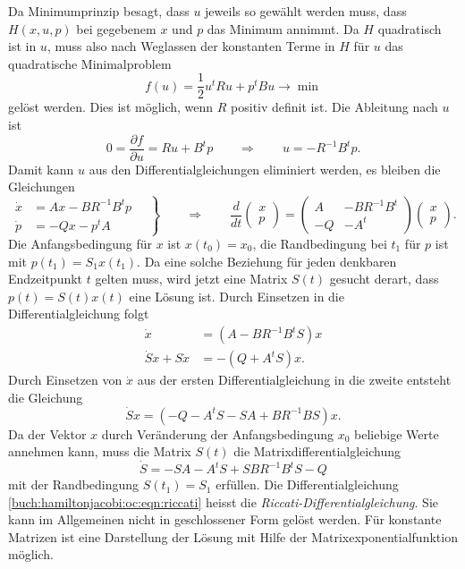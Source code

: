 Da  Minimumprinzip besagt, dass $u$ jeweils so gewählt werden muss,
dass $H(x,u,p)$ bei gegebenem $x$ und $p$ das Minimum annimmt.
Da $H$ quadratisch ist in $u$, muss also nach Weglassen der konstanten
Terme in $H$ für $u$ das quadratische Minimalproblem
\[
f(u)
=
\frac12 u^t R u + p^t Bu
\to
\min
\]
gelöst werden.
Dies ist möglich, wenn $R$ positiv definit ist.
Die Ableitung nach $u$ ist
\[
0
=
\frac{\partial f}{\partial u}
=
Ru + B^tp
\qquad\Rightarrow\qquad
u
=
-
R^{-1}B^t p.
\]
Damit kann $u$ aus den Differentialgleichungen eliminiert werden, 
es bleiben die Gleichungen
\begin{equation}
\left.
\begin{aligned}
\dot{x}
&=
Ax-BR^{-1}B^t p
\\
\dot{p}
&=
-Qx -p^tA
\end{aligned}
\quad
\right\}
\qquad\Rightarrow\qquad
\frac{d}{dt}
\begin{pmatrix}
x\\
p
\end{pmatrix}
=
\begin{pmatrix}
 A & -BR^{-1}B^t \\
-Q & -A^t
\end{pmatrix}
\begin{pmatrix}
x\\
p
\end{pmatrix}.
\end{equation}
Die Anfangsbedingung für $x$ ist $x(t_0)=x_0$, die Randbedingung bei
$t_1$ für $p$ ist mit
$p(t_1)=S_1x(t_1)$.
Da eine solche Beziehung für jeden denkbaren Endzeitpunkt $t$
gelten muss, wird jetzt eine Matrix $S(t)$ gesucht derart,
dass $p(t)=S(t)x(t)$ eine Lösung ist.
Durch Einsetzen in die Differentialgleichung folgt
\begin{align}
\dot{x} &= (A - BR^{-1}B^t S)x
\label{buch:hamiltonjacobi:oc:lqc:xdot}
\\
\dot{S}x+S\dot{x} &= -(Q+A^tS)x.
\label{buch:hamiltonjacobi:oc:lqc:Sdot}
\end{align}
Durch Einsetzen von $\dot{x}$ aus der ersten Differentialgleichung
in die zweite entsteht die Gleichung
\[
\dot{S}x
=
(
-Q-A^tS  - SA+BR^{-1}B S
)
x.
\]
Da der Vektor $x$ durch Veränderung der Anfangsbedingung $x_0$ beliebige
Werte annehmen kann, muss die Matrix $S(t)$ die Matrixdifferentialgleichung
\begin{equation}
\dot{S}
=
-SA -A^tS+SBR^{-1}B^tS-Q
\label{buch:hamiltonjacobi:oc:eqn:riccati}
\end{equation}
mit der Randbedingung $S(t_1)=S_1$ erfüllen.
Die Differentialgleichung
\eqref{buch:hamiltonjacobi:oc:eqn:riccati}
heisst die {\em Riccati-Differentialgleichung}.
%
Sie kann im Allgemeinen nicht in geschlossener Form gelöst werden.
Für konstante Matrizen ist eine Darstellung der Lösung mit Hilfe
der Matrixexponentialfunktion möglich.


